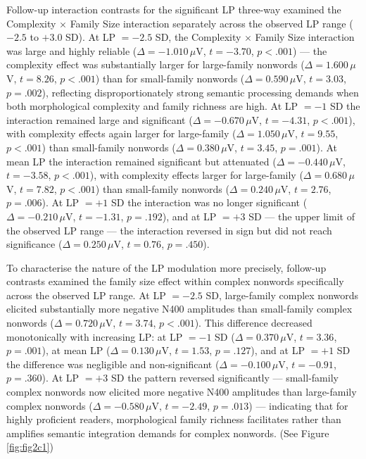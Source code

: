 \documentclass[utf8]{FrontiersinHarvard} %
\begin{document}
	Follow-up interaction contrasts for the significant LP three-way examined the Complexity $\times$ Family Size interaction separately across the observed LP range ($-2.5$ to $+3.0$ SD). At LP $= -2.5$ SD, the Complexity $\times$ Family Size interaction was large and highly reliable ($\Delta = -1.010\,\mu$V, $t = -3.70$, $p < .001$) --- the complexity effect was substantially larger for large-family nonwords ($\Delta = 1.600\,\mu$V, $t = 8.26$, $p < .001$) than for small-family nonwords ($\Delta = 0.590\,\mu$V, $t = 3.03$, $p = .002$), reflecting disproportionately strong semantic processing demands when both morphological complexity and family richness are high. At LP $= -1$ SD the interaction remained large and significant ($\Delta = -0.670\,\mu$V, $t = -4.31$, $p < .001$), with complexity effects again larger for large-family ($\Delta = 1.050\,\mu$V, $t = 9.55$, $p < .001$) than small-family nonwords ($\Delta = 0.380\,\mu$V, $t = 3.45$, $p = .001$). At mean LP the interaction remained significant but attenuated ($\Delta = -0.440\,\mu$V, $t = -3.58$, $p < .001$), with complexity effects larger for large-family ($\Delta = 0.680\,\mu$V, $t = 7.82$, $p < .001$) than small-family nonwords ($\Delta = 0.240\,\mu$V, $t = 2.76$, $p = .006$). At LP $= +1$ SD the interaction was no longer significant ($\Delta = -0.210\,\mu$V, $t = -1.31$, $p = .192$), and at LP $= +3$ SD --- the upper limit of the observed LP range --- the interaction reversed in sign but did not reach significance ($\Delta = 0.250\,\mu$V, $t = 0.76$, $p = .450$).
	
	To characterise the nature of the LP modulation more precisely, follow-up contrasts examined the family size effect within complex nonwords specifically across the observed LP range. At LP $= -2.5$ SD, large-family complex nonwords elicited substantially more negative N400 amplitudes than small-family complex nonwords ($\Delta = 0.720\,\mu$V, $t = 3.74$, $p < .001$). This difference decreased monotonically with increasing LP: at LP $= -1$ SD ($\Delta = 0.370\,\mu$V, $t = 3.36$, $p = .001$), at mean LP ($\Delta = 0.130\,\mu$V, $t = 1.53$, $p = .127$), and at LP $= +1$ SD the difference was negligible and non-significant ($\Delta = -0.100\,\mu$V, $t = -0.91$, $p = .360$). At LP $= +3$ SD the pattern reversed significantly --- small-family complex nonwords now elicited more negative N400 amplitudes than large-family complex nonwords ($\Delta = -0.580\,\mu$V, $t = -2.49$, $p = .013$) --- indicating that for highly proficient readers, morphological family richness facilitates rather than amplifies semantic integration demands for complex nonwords.  (See Figure \ref{fig:fig2c1})
	
\end{document}
